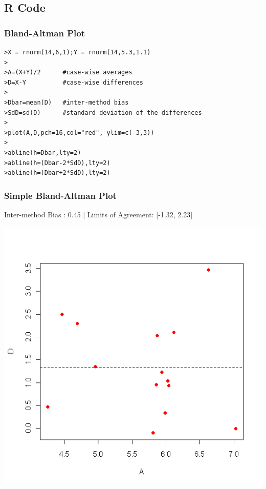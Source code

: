 \documentclass[compress]{beamer}        %
\begin{document}
\subsection*{R Code}
\begin{frame}[fragile]
\frametitle{Bland-Altman Plot}
\begin{verbatim}
>X = rnorm(14,6,1);Y = rnorm(14,5.3,1.1)
>
>A=(X+Y)/2		#case-wise averages
>D=X-Y			#case-wise differences
>		
>Dbar=mean(D)	#inter-method bias
>SdD=sd(D)		#standard deviation of the differences
>
>plot(A,D,pch=16,col="red", ylim=c(-3,3))
>
>abline(h=Dbar,lty=2)
>abline(h=(Dbar-2*SdD),lty=2)
>abline(h=(Dbar+2*SdD),lty=2)
\end{verbatim}
\end{frame}


\begin{frame}
\frametitle{Simple Bland-Altman Plot}
Inter-method Bias : 0.45 | Limits of Agreement: [-1.32, 2.23]
\vspace{0.5cm}
\begin{center}
\includegraphics[scale = 0.30]{SimpleBAplot}
\end{center}
\end{frame}
\end{document}
